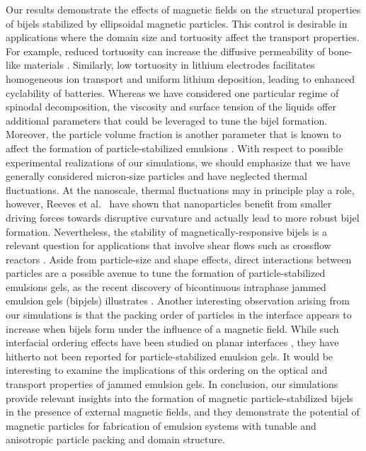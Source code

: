 Our results demonstrate the effects of magnetic fields on the structural
properties of bijels stabilized by ellipsoidal magnetic particles. This
control is desirable in applications where the domain size and
tortuosity affect the transport properties. For example, reduced
tortuosity can increase the diffusive permeability of bone-like
materials \cite{prakoso2023tortuosity}. Similarly, low tortuosity
in lithium electrodes facilitates homogeneous ion transport and
uniform lithium deposition, leading to enhanced cyclability of
batteries\cite{chen_tortuosity_2020, ebner_tortuosity_2014}. Whereas we
have considered one particular regime of spinodal decomposition, the
viscosity and surface tension of the liquids offer additional parameters
that could be leveraged to tune the bijel formation. Moreover, the
particle volume fraction is another parameter that is known to affect
the formation of particle-stabilized emulsions
\cite{jansen_bijels_2011,hijnen_bijels_2015}. With respect to possible
experimental realizations of our simulations, we should emphasize that
we have generally considered micron-size particles and have neglected
thermal fluctuations. At the nanoscale, thermal fluctuations may in
principle play a role, however, Reeves et
al.~\cite{reeves_particle-size_2015} have shown that nanoparticles
benefit from smaller driving forces towards disruptive curvature and
actually lead to more robust bijel formation. Nevertheless, the
stability of magnetically-responsive bijels is a relevant question for
applications that involve shear flows such as crossflow reactors
\cite{khan_nanostructured_2022}. Aside from particle-size and shape
effects, direct interactions between particles are a possible avenue
to tune the formation of particle-stabilized emulsions gels, as the
recent discovery of bicontinuous intraphase jammed emulsion gels
(bipjels) illustrates \cite{kinkead_bicontinuous_2019}. Another
interesting observation arising from our simulations is that the
packing order of particles in the interface appears to increase when
bijels form under the influence of a magnetic field. While such
interfacial ordering effects have been studied on planar interfaces
\cite{toor_self-assembly_2016,shi_nanoparticle_2018,kim_dynamic_2022},
they have hitherto not been reported for particle-stabilized emulsion
gels. It would be interesting to examine the implications of this
ordering on the optical and transport properties of jammed emulsion
gels. In conclusion, our simulations provide relevant insights into the
formation of magnetic particle-stabilized bijels in the presence of
external magnetic fields, and they demonstrate the potential of magnetic
particles for fabrication of emulsion systems with tunable and
anisotropic particle packing and domain structure.